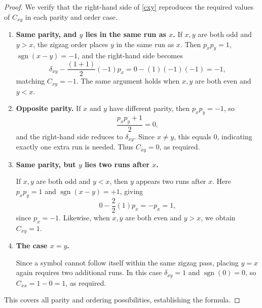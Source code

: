 \documentclass[a4paper,12pt]{article}
\theoremstyle{definition}
\numberwithin{equation}{section}
\begin{document}
\begin{proof}
We verify that the right-hand side of \eqref{cxy} reproduces the required values of
$C_{xy}$ in each parity and order case.
\begin{enumerate}
    \item \textbf{Same parity, and $y$ lies in the same run as $x$.}
\smallskip
If $x,y$ are both odd and $y>x$, the zigzag order places $y$ in the same run as $x$.
Then $p_x p_y = 1$, $\operatorname{sgn}(x-y) = -1$, and the right-hand side becomes
\[
\delta_{xy} - \frac{(1+1)}{2}(-1)p_x = 0 - (1)(-1)(-1)= -1,
\]
matching $C_{xy}=-1$.  
The same argument holds when $x,y$ are both even and $y<x$.

\item \textbf{Opposite parity.}
\smallskip
If $x$ and $y$ have different parity, then $p_x p_y = -1$, so
\[
\frac{p_x p_y + 1}{2} = 0,
\]
and the right-hand side reduces to $\delta_{xy}$.  
Since $x\neq y$, this equals $0$, indicating exactly one extra run is needed.  
Thus $C_{xy}=0$, as required.

\item \textbf{Same parity, but $y$ lies two runs after $x$.}

\smallskip
If $x,y$ are both odd and $y<x$, then $y$ appears two runs after $x$.  
Here $p_x p_y = 1$ and $\operatorname{sgn}(x-y)=+1$, giving
\[
0 - \frac{2}{2}(1)p_x = -p_x = 1,
\]
since $p_x=-1$.  
Likewise, when $x,y$ are both even and $y>x$, we obtain $C_{xy}=1$.

\item \textbf{The case $x=y$.}

\smallskip
Since a symbol cannot follow itself within the same zigzag pass, placing $y=x$ again
requires two additional runs.  
In this case $\delta_{xy}=1$ and $\operatorname{sgn}(0)=0$, so $C_{xx} = 1 - 0 = 1$, as required.
\end{enumerate}

\medskip
This covers all parity and ordering possibilities, establishing the formula.
\end{proof}

\end{document}
